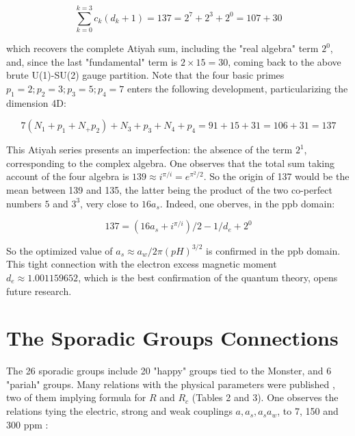 \documentclass[a4paper,9pt]{article}
\begin{document}
\begin{equation}\label{Eq50}
 \sum_{k=0}^{k=3} c_k (d_k + 1) = 137 = 2^7 + 2^3 + 2^0 = 107 + 30
 \end{equation}

which recovers the complete Atiyah sum, including the "real algebra" term $2^0$, and, since the last "fundamental" term is $2\times 15 = 30$, coming back to the above brute U(1)-SU(2) gauge partition. Note that the four basic primes $p_1 = 2; p_2 = 3; p_3 = 5; p_4 = 7$ enters the following development, particularizing the dimension 4D:

\begin{equation}\label{Eq50}
 7(N_1 + p_1 + N_ + p_2) + N_3 + p_3 + N_4 + p_4  = 91 + 15 + 31 = 106 + 31 = 137
 \end{equation}

This Atiyah series presents an imperfection: the absence of the term $2^1$, corresponding to the complex algebra. One observes that the total sum taking account of the four algebra is $139 \approx i^{\pi/i} = e^{\pi^2/2}$. So the origin of 137 would be the mean between 139 and 135, the latter being the product of the two co-perfect numbers $5$ and $3^3$, very close to $16a_s$. Indeed, one oberves, in the ppb domain:

 \begin{equation}\label{Eq51}
 137 = (16a_s + i^{\pi/i})/2 - 1/d_e + 2^0
 \end{equation}

So the optimized value of $a_s\approx a_w/2\pi (pH)^{3/2}$ is confirmed in the ppb domain. This tight connection with the electron excess magnetic moment $d_e \approx 1.001159652$, which is the best confirmation of the quantum theory, opens future research.




\section{The Sporadic Groups Connections} 

The 26 sporadic groups include 20 "happy" groups tied to the Monster, and 6 "pariah" groups. Many relations with the physical parameters were published \cite{Sanchez3}, two of them implying formula for $R$ and $R_c$ (Tables 2 and 3). One observes the relations tying the electric, strong and weak couplings $a, a_s,a_s a_w$, to 7, 150 and 300 ppm  : 



\end{document}
